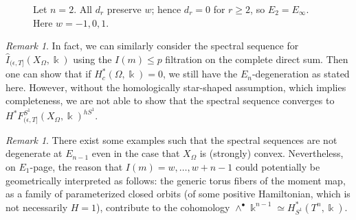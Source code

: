 \documentclass[11pt]{amsart}
\numberwithin{equation}{section}
\theoremstyle{plain}
\theoremstyle{definition}
\theoremstyle{remark}
\newtheorem{RMK}[rmk]{Remark}
\begin{document}
\begin{figure}[htbp]
      \caption{Let $n=2$. All $d_r$ preserve $w$; hence $d_r=0$ for $r\ge2$, so $E_2=E_\infty$. Here $w=-1,0,1$.}
    \label{fig:spectral sequence degeneration}
\end{figure}
\begin{RMK}In fact, we can similarly consider the spectral sequence for $\widehat{I}_{(\epsilon,T]}(X_\Omega,\Bbbk)$ using the $I(m)\leq p $ filtration on the complete direct sum. Then one can show that if $H^*_c(\Omega,\Bbbk)=0$, we still have the $E_n$-degeneration as stated here. However, without the homologically star-shaped assumption, which implies completeness, we are not able to show that the spectral sequence converges to $H^*F^{S^1}_{(\epsilon,T]}(X_\Omega,\Bbbk)^{hS^1}$.
\end{RMK}
\begin{RMK}There exist some examples such that the spectral sequences are not degenerate at $ E_ {n-1} $ even in the case that $X_\Omega$ is (strongly) convex. Nevertheless, on $E_1$-page, the reason that $I(m)=w,\dots,w+n-1$ could potentially be geometrically interpreted as follows: the generic torus fibers of the moment map, as a family of parameterized closed orbits (of some positive Hamiltonian, which is not necessarily $H=1$), contribute to the cohomology $\wedge^\bullet\Bbbk^{n-1}\simeq H^*_{S^1}(T^n,\Bbbk)$.
\end{RMK}
\end{document}
